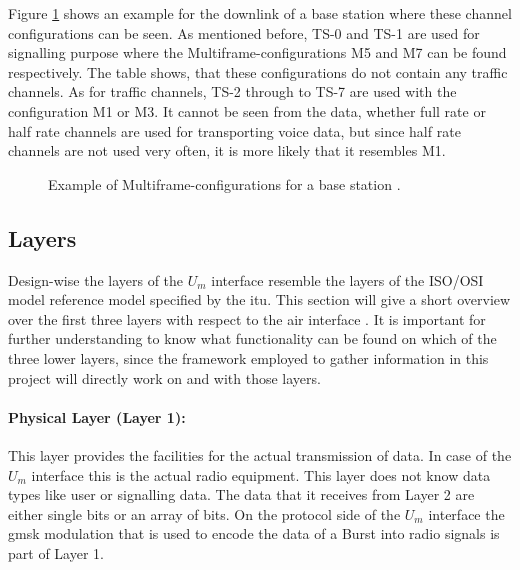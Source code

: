 Figure \ref{fig:channel_example} shows an example \cite{kommsys2006} for the downlink of a base station where these channel configurations can be seen.
As mentioned before, TS-0 and TS-1 are used for signalling purpose where the Multiframe-configurations M5 and M7 can be found respectively.
The table shows, that these configurations do not contain any traffic channels.
As for traffic channels, TS-2 through to TS-7 are used with the configuration M1 or M3.
It cannot be seen from the data, whether full rate or half rate channels are used for transporting voice data, but since half rate channels are not used very often, it is more likely that it resembles M1.
\begin{figure}
	\centering
	\caption{Example of Multiframe-configurations for a base station \cite{kommsys2006}.}
	\label{fig:channel_example}
\end{figure}

\subsection{Layers}
\label{sec:layers}
Design-wise the layers of the $U_m$ interface resemble the layers of the ISO/OSI model reference model specified by the \gls{itu}.
This section will give a short overview over the first three layers with respect to the air interface \cite{protocols1999}.
It is important for further understanding to know what functionality can be found on which of the three lower layers, since the framework employed to gather information in this project will directly work on and with those layers.

\paragraph{Physical Layer (Layer 1):} This layer provides the facilities for the actual transmission of data.
In case of the $U_m$ interface this is the actual radio equipment.
This layer does not know data types like user or signalling data.
The data that it receives from Layer 2 are either single bits or an array of bits.
On the protocol side of the $U_m$ interface the \gls{gmsk} modulation that is used to encode the data of a Burst into radio signals is part of Layer 1.

